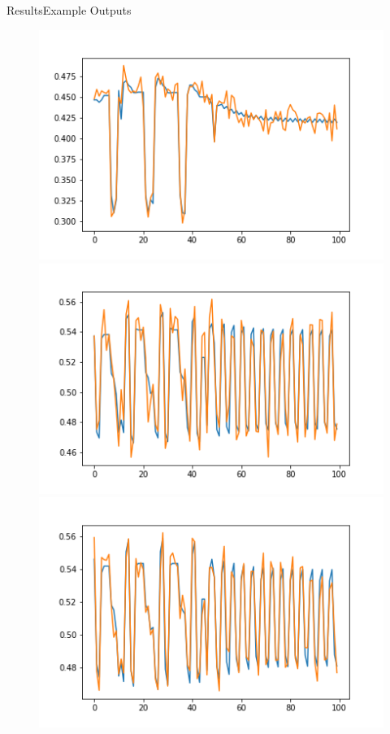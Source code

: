 \documentclass[handout]{beamer}
\begin{document}
\begin{frame}{Results}{Example Outputs}
\begin{center}
  \begin{figure}
  \includegraphics[scale=0.25]{images/plot_current1}
  \includegraphics[scale=0.25]{images/plot_current2}
  \includegraphics[scale=0.25]{images/plot_torque}
  \end{figure}
\end{center}
\end{frame}
\end{document}
